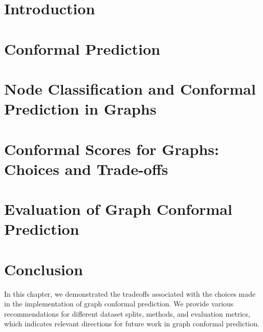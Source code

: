 \section{Introduction}


\section{Conformal Prediction}



\section{Node Classification and Conformal Prediction in Graphs}


\section{Conformal Scores for Graphs: Choices and Trade-offs}
\label{chp:graphConformal:sec:conformal_scores_tradeoffs}


\section{Evaluation of Graph Conformal Prediction}


\section{Conclusion}
In this chapter, we demonstrated the tradeoffs associated with the choices made in the implementation of graph conformal prediction.
We provide various recommendations for different dataset splits, methods, and evaluation metrics, which indicates relevant directions for future work in graph conformal prediction.

\begin{subappendices}
    
\end{subappendices}
